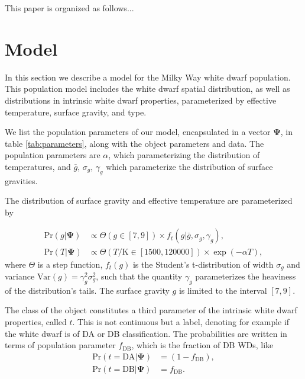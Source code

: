 \documentclass[fleqn,usenatbib]{mnras}
\newcommand{\popp}{\boldsymbol{\Psi}}
\newcommand{\Teff}{T}
\newcommand{\logg}{g}
\newcommand{\pr}{\text{Pr}}
\newcommand{\K}{\text{K}}
\begin{document}
This paper is organized as follows...





\section{Model}\label{sec:model}

In this section we describe a model for the Milky Way white dwarf population. This population model includes the white dwarf spatial distribution, as well as distributions in intrinsic white dwarf properties, parameterized by effective temperature, surface gravity, and type.

We list the population parameters of our model, encapsulated in a vector $\popp$, in table \ref{tab:parameters}, along with the object parameters and data. The population parameters are $\alpha$, which parameterizing the distribution of temperatures, and $\bar{g}$, $\sigma_g$, $\gamma_g$ which parameterize the distribution of surface gravities.

The distribution of surface gravity and effective temperature are parameterized by

\begin{equation}\label{eq:T&g}
\begin{split}
	\pr(\logg | \popp) & \propto \Theta(\logg \in [7,9]) \times f_t(\logg|\bar{g},\sigma_g,\gamma_g),\\
    \pr(\Teff | \popp) & \propto \Theta(\Teff/\K \in [1500,120000]) \times \exp (-\alpha \Teff),
\end{split}
\end{equation}
where $\Theta$ is a step function, $f_t(\logg)$ is the Student's t-distribution of width $\sigma_g$ and variance $\text{Var}(g) = \gamma_g^2 \sigma_g^2$, such that the quantity $\gamma_g$ parameterizes the heaviness of the distribution's tails. The surface gravity $\logg$ is limited to the interval $[7,9]$.

The class of the object constitutes a third parameter of the intrinsic white dwarf properties, called $t$. This is not continuous but a label, denoting for example if the white dwarf is of DA or DB classification. The probabilities are written in terms of population parameter $f_\text{DB}$, which is the fraction of DB WDs, like
\begin{equation}\label{eq:DADB}
\begin{split}
	\pr(t=\text{DA} | \popp) & = (1-f_\text{DB}),\\
    \pr(t=\text{DB} | \popp) & = f_\text{DB}.
\end{split}
\end{equation}
\end{document}

